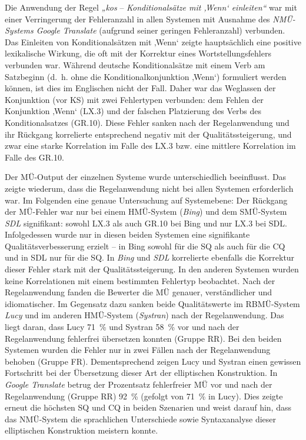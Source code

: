 Die Anwendung der Regel \textit{„kos} -- \textit{Konditionalsätze mit ‚Wenn‘ einleiten“} war mit einer Verringerung der Fehleranzahl in allen Systemen mit Ausnahme des \textit{NMÜ-Systems Google Translate} (aufgrund seiner geringen Fehleranzahl) verbunden. Das Einleiten von Konditionalsätzen mit ‚Wenn‘ zeigte hauptsächlich eine positive lexikalische Wirkung, die oft mit der Korrektur eines Wortstellungsfehlers verbunden war. Während deutsche Konditionalsätze mit einem Verb am Satzbeginn (d.~h. ohne die Konditionalkonjunktion ‚Wenn‘) formuliert werden können, ist dies im Englischen nicht der Fall. Daher war das Weglassen der Konjunktion (vor KS) mit zwei Fehlertypen verbunden: dem Fehlen der Konjunktion ‚Wenn‘ (LX.3) und der falschen Platzierung des Verbs des Konditionalsatzes (GR.10). Diese Fehler sanken nach der Regelanwendung und ihr Rückgang korrelierte entsprechend negativ mit der Qualitätssteigerung, und zwar eine starke Korrelation im Falle des LX.3 bzw. eine mittlere Korrelation im Falle des GR.10.\clearpage

Der MÜ-Output der einzelnen Systeme wurde unterschiedlich beeinflusst. Das zeigte wiederum, dass die Regelanwendung nicht bei allen Systemen erforderlich war. Im Folgenden eine genaue Untersuchung auf Systemebene: Der Rückgang der MÜ-Fehler war nur bei einem HMÜ-System (\textit{Bing}) und dem SMÜ-System \textit{SDL} signifikant: sowohl LX.3 als auch GR.10 bei Bing und nur LX.3 bei SDL. Infolgedessen wurde nur in diesen beiden Systemen eine signifikante Qualitätsverbesserung erzielt -- in Bing sowohl für die SQ als auch für die CQ und in SDL nur für die SQ. In \textit{Bing} und \textit{SDL} korrelierte ebenfalls die Korrektur dieser Fehler stark mit der Qualitätssteigerung. In den anderen Systemen wurden keine Korrelationen mit einem bestimmten Fehlertyp beobachtet. Nach der Regelanwendung fanden die Bewerter die MÜ genauer, verständlicher und idiomatischer. Im Gegensatz dazu sanken beide Qualitätswerte im RBMÜ-System \textit{Lucy} und im anderen HMÜ-System (\textit{Systran}) nach der Regelanwendung. Das liegt daran, dass Lucy 71~\% und Systran 58~\% vor und nach der Regelanwendung fehlerfrei übersetzen konnten (Gruppe RR). Bei den beiden Systemen wurden die Fehler nur in zwei Fällen nach der Regelanwendung behoben (Gruppe FR). Dementsprechend zeigen Lucy und Systran einen gewissen Fortschritt bei der Übersetzung dieser Art der elliptischen Konstruktion. In \textit{Google Translate} betrug der Prozentsatz fehlerfreier MÜ vor und nach der Regelanwendung (Gruppe RR) 92~\% (gefolgt von 71~\% in Lucy). Dies zeigte erneut die höchsten SQ und CQ in beiden Szenarien und weist darauf hin, dass das NMÜ-System die sprachlichen Unterschiede sowie Syntaxanalyse dieser elliptischen Konstruktion meistern konnte.

